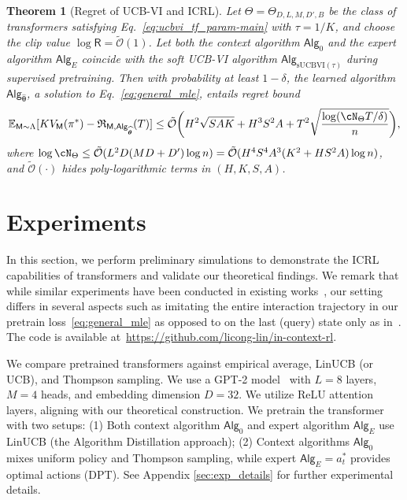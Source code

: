\documentclass[10pt]{article}
\newtheorem{theorem}{Theorem}
\newcommand{\<}{\left\langle}
\renewcommand{\>}{\right\rangle}
\newcommand{\E}{\mathbb{E}}
\newcommand{\inst}{{\mathsf{M}}}
\newcommand{\temp}{{\tau}}
\newcommand{\tcO}{{\tilde{\mathcal O}}}
\newcommand{\action}{{a}}
\newcommand{\totlen}{{T}}
\newcommand{\sAlg}{{\mathsf{Alg}}}
\newcommand{\Numobs}{{n}}
\newcommand{\Parspace}{{\Theta}}
\newcommand{\esttfpar}{{\widehat{\btheta}}}
\newcommand{\plc}{{\pi}}
\newcommand{\prior}{{\Lambda}}
\newcommand{\Numepi}{{K}}
\newcommand{\horizon}{{H}}
\renewcommand{\horizon}{{H}}
\newcommand{\valuefun}{{V}}
\newcommand{\shortexp}{{E}}
\newcommand{\layer}{{L}}
\newcommand{\hidden}{{D'}}
\newcommand{\head}{{M}}
\newcommand{\clipval}{{\mathsf{R}}}
\newcommand{\embd}{{D}}
\newcommand{\totreward}{{\mathfrak{R}}}
\newcommand{\Numst}{{S}}
\newcommand{\Numact}{{A}}
\newcommand{\Vfun}{{\valuefun}}
\newcommand{\sUCBVI}{{\mathrm{sUCBVI}}}
\def\btheta{{\boldsymbol \theta}}
\begin{document}
\begin{theorem}[Regret of UCB-VI and ICRL]\label{thm:ucbvi_icrl-main}
Let $\Theta = \Theta_{D, L, M, \hidden, B}$ be the class of transformers satisfying Eq.~\eqref{eq:ucbvi_tf_param-main} with $\temp = 1/\Numepi$, and choose the clip value $\log \clipval = \tcO(1)$. Let both the context algorithm $\sAlg_0$ and the expert algorithm $\sAlg_\shortexp$ coincide with the soft UCB-VI algorithm $\sAlg_{\sUCBVI(\tau)}$ during supervised pretraining.  Then with probability at least $1-\delta$, the learned algorithm $\sAlg_{\esttfpar}$, a solution to Eq.~\eqref{eq:general_mle}, entails regret bound
\begin{align*}
\E_{\inst\sim\prior}[\Numepi\Vfun_\inst(\plc^*)-\totreward_{\inst,\sAlg_\esttfpar}(\totlen)]\leq \tcO \bigg(\horizon^2\sqrt{\Numst\Numact\Numepi}+\horizon^3\Numst^2\Numact+\totlen^2\sqrt{\frac{\log ( \cN_{\Parspace} \totlen/\delta ) }{n} } \bigg),
\end{align*}
where $\log \cN_{\Parspace} \le \tcO(\layer^2\embd(\head\embd+\hidden) \log\Numobs) = \tcO(\horizon^4\Numst^4\Numact^3(\Numepi^2+\horizon\Numst^2\Numact)\log\Numobs)$, and $\tcO(\cdot)$ hides poly-logarithmic terms in $(\horizon,\Numepi,\Numst,\Numact)$.
\end{theorem}
\section{Experiments}
\label{sec:experiments}






In this section, we perform preliminary simulations to demonstrate the ICRL capabilities of transformers and validate our theoretical findings. We remark that while similar experiments have been conducted in existing works~\citep{laskin2022context,lee2023supervised}, our setting differs in several aspects such as imitating the entire interaction trajectory in our pretrain loss~\eqref{eq:general_mle} as opposed to on the last (query) state only as in~\citet{lee2023supervised}. The code is available at~\href{https://github.com/licong-lin/in-context-rl}{https://github.com/licong-lin/in-context-rl}.





We compare pretrained transformers against empirical average, LinUCB (or UCB), and Thompson sampling. We use a GPT-2 model~\cite{garg2022can,lee2023supervised} with $L = 8$ layers, $M=4$ heads, and embedding dimension $D=32$. We utilize ReLU attention layers, aligning with our theoretical construction. We pretrain the transformer with two setups: (1) Both context algorithm $\sAlg_0$ and expert algorithm $\sAlg_{\shortexp}$ use LinUCB (the Algorithm Distillation approach); (2) Context algorithms $\sAlg_0$ mixes uniform policy and Thompson sampling, while expert $\sAlg_{\shortexp} = \action_t^*$ provides optimal actions (DPT). See Appendix \ref{sec:exp_details} for further experimental details.
\end{document}
